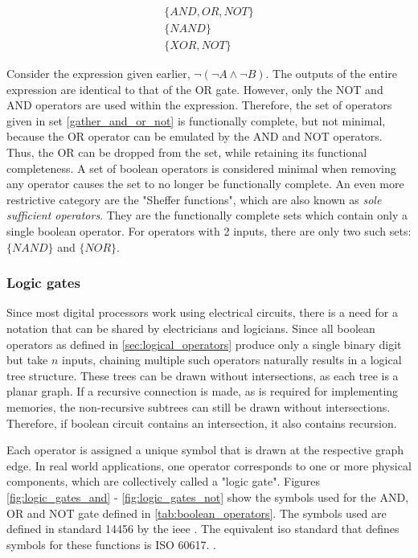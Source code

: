 \begin{gather}
    \{AND, OR, NOT\} \label{gather_and_or_not} \\
    \{NAND\}         \\
    \{XOR, NOT\}
\end{gather}

Consider the expression given earlier, $\neg(\neg A \land \neg B)$. The outputs of the entire expression are identical to that of the OR gate. However, only the NOT and AND operators are used within the expression. Therefore, the set of operators given in set \ref{gather_and_or_not} is functionally complete, but not minimal, because the OR operator can be emulated by the AND and NOT operators. Thus, the OR can be dropped from the set, while retaining its functional completeness. A set of boolean operators is considered minimal when removing any operator causes the set to no longer be functionally complete. An even more restrictive category are the "Sheffer functions", which are also known as \textit{sole sufficient operators}. They are the functionally complete sets which contain only a single boolean operator. For operators with 2 inputs, there are only two such sets: $\{NAND\}$ and $\{NOR\}$.

\subsubsection{Logic gates}

Since most digital processors work using electrical circuits, there is a need for a notation that can be shared by electricians and logicians. Since all boolean operators as defined in \autoref{sec:logical_operators} produce only a single binary digit but take $n$ inputs, chaining multiple such operators naturally results in a logical tree structure. These trees can be drawn without intersections, as each tree is a planar graph\cite{West2001}. If a recursive connection is made, as is required for implementing memories, the non-recursive subtrees can still be drawn without intersections. Therefore, if boolean circuit contains an intersection, it also contains recursion. 

Each operator is assigned a unique symbol that is drawn at the respective graph edge. In real world applications, one operator corresponds to one or more physical components, which are collectively called a "logic gate". Figures \ref{fig:logic_gates_and} - \ref{fig:logic_gates_not} show the symbols used for the AND, OR and NOT gate defined in \autoref{tab:boolean_operators}. The symbols used are defined in standard 14456 by the \ac{ieee} \cite{STD14456}. The equivalent \ac{iso} standard that defines symbols for these functions is ISO 60617. \cite{ISO60617}.

